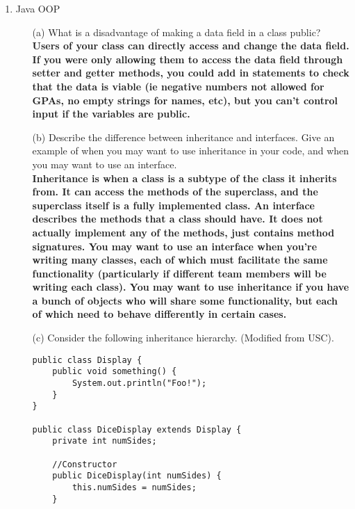 \documentclass[letter]{article}
\def\coursename{CS 201: Data Structures}
\newcommand{\header}[1]{%
	\begin{center}
		\fbox{
			\begin{minipage}{6in}
				\textbf{\coursename} \hfill       \\
				\textit{#1} \hfill \textit{\today}
			\end{minipage}
		}
	\end{center}
	\vspace*{4mm}
}
\begin{document}
\header{Exam prep}

\begin{enumerate} [1.]
    \item Java OOP
    \begin{itemize}
        \item [(a)] What is a disadvantage of making a data field in a class public? \\

        \textbf{Users of your class can directly access and change the data field. If you were only allowing them to access the data field through setter and getter methods, you could add in statements to check that the data is viable (ie negative numbers not allowed for GPAs, no empty strings for names, etc), but you can’t control input if the variables are public.}\\

        \item [(b)] Describe the difference between inheritance and interfaces. Give an example of when you may want to use inheritance in your code, and when you may want to use an interface. \\

        \textbf{Inheritance is when a class is a subtype of the class it inherits from. It can access the methods of the superclass, and the superclass itself is a fully implemented class. An interface describes the methods that a class should have. It does not actually implement any of the methods, just contains method signatures. You may want to use an interface when you’re writing many classes, each of which must facilitate the same functionality (particularly if different team members will be writing each class). You may want to use inheritance if you have a bunch of objects who will share some functionality, but each of which need to behave differently in certain cases.}\\
        
        \item [(c)] Consider the following inheritance hierarchy. (Modified from USC). 

        \begin{verbatim}
public class Display {
    public void something() {
        System.out.println("Foo!");
    }
}

public class DiceDisplay extends Display {
    private int numSides;

    //Constructor
    public DiceDisplay(int numSides) {
        this.numSides = numSides;
    }


\end{verbatim}
\end{itemize}
\end{enumerate}
\end{document}
